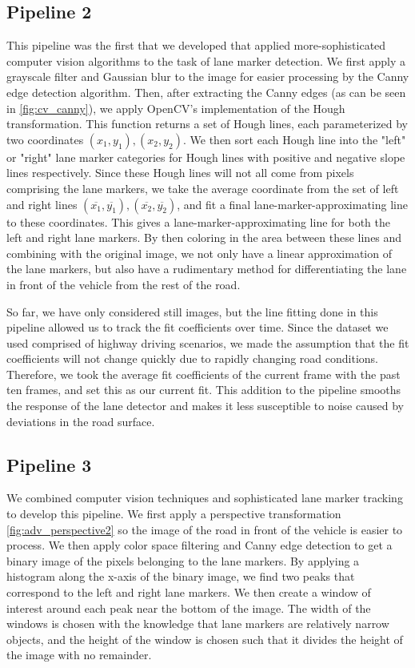 \documentclass[conf]{new-aiaa}
\begin{document}
\subsection{Pipeline 2}
This pipeline was the first that we developed that applied more-sophisticated computer vision algorithms to the task of lane marker detection.  We first apply a grayscale filter and Gaussian blur to the image for easier processing by the Canny edge detection algorithm.  Then, after extracting the Canny edges (as can be seen in \ref{fig:cv_canny}), we apply OpenCV's implementation of the Hough transformation.  This function returns a set of Hough lines, each parameterized by two coordinates $(x_{1}, y_{1}), (x_{2}, y_{2})$.  We then sort each Hough line into the "left" or "right" lane marker categories for Hough lines with positive and negative slope lines respectively.  Since these Hough lines will not all come from pixels comprising the lane markers, we take the average coordinate from the set of left and right lines $(\overline{x_{1}}, \overline{y_{1}}), (\overline{x_{2}}, \overline{y_{2}})$, and fit a final lane-marker-approximating line to these coordinates. This gives a lane-marker-approximating line for both the left and right lane markers.  By then coloring in the area between these lines and combining with the original image, we not only have a linear approximation of the lane markers, but also have a rudimentary method for differentiating the lane in front of the vehicle from the rest of the road.

So far, we have only considered still images, but the line fitting done in this pipeline allowed us to track the fit coefficients over time.  Since the dataset we used comprised of highway driving scenarios, we made the assumption that the fit coefficients will not change quickly due to rapidly changing road conditions.  Therefore, we took the average fit coefficients of the current frame with the past ten frames, and set this as our current fit.  This addition to the pipeline smooths the response of the lane detector and makes it less susceptible to noise caused by deviations in the road surface.


\subsection{Pipeline 3}
We combined computer vision techniques and sophisticated lane marker tracking to develop this pipeline.  We first apply a perspective transformation \ref{fig:adv_perspective2} so the image of the road in front of the vehicle is easier to process.  We then apply color space filtering and Canny edge detection to get a binary image of the pixels belonging to the lane markers.  By applying a histogram along the x-axis of the binary image, we find two peaks that correspond to the left and right lane markers.  We then create a window of interest around each peak near the bottom of the image.  The width of the windows is chosen with the knowledge that lane markers are relatively narrow objects, and the height of the window is chosen such that it divides the height of the image with no remainder.
\end{document}
